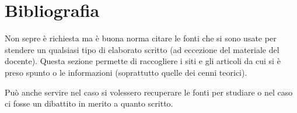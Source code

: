 \section{Bibliografia}
Non sepre è richiesta ma è buona norma citare le fonti che si sono usate per stendere un qualsiasi tipo di elaborato scritto (ad eccezione del materiale del docente).
Questa sezione permette di raccogliere i siti e gli articoli da cui si è preso spunto o le informazioni (soprattutto quelle dei cenni teorici). 

Può anche servire nel caso si volessero recuperare le fonti per studiare o nel caso ci fosse un dibattito in merito a quanto scritto.


\printbibliography %